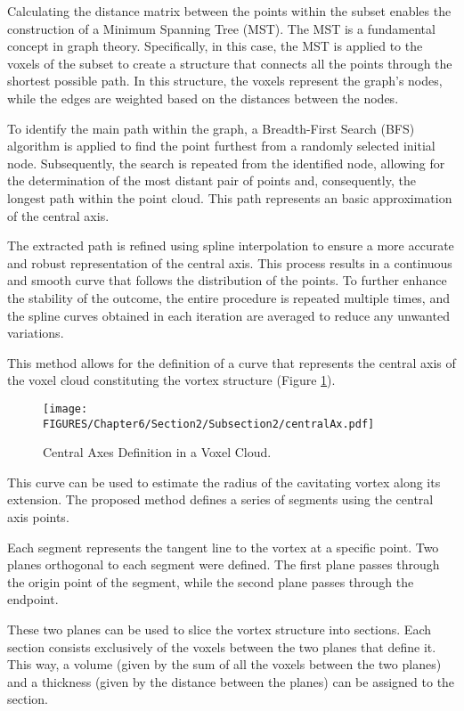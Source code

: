Calculating the distance matrix between the points within the subset enables the construction of a Minimum Spanning Tree (MST). 
The MST is a fundamental concept in graph theory. Specifically, in this case, the MST is applied to the voxels of the subset to create a structure that connects all the points through the shortest possible path. In this structure, the voxels represent the graph's nodes, while the edges are weighted based on the distances between the nodes.

To identify the main path within the graph, a Breadth-First Search (BFS) algorithm is applied to find the point furthest from a randomly selected initial node. Subsequently, the search is repeated from the identified node, allowing for the determination of the most distant pair of points and, consequently, the longest path within the point cloud. This path represents an basic approximation of the central axis.

The extracted path is refined using spline interpolation to ensure a more accurate and robust representation of the central axis. This process results in a continuous and smooth curve that follows the distribution of the points. 
To further enhance the stability of the outcome, the entire procedure is repeated multiple times, and the spline curves obtained in each iteration are averaged to reduce any unwanted variations.

This method allows for the definition of a curve that represents the central axis of the voxel cloud constituting the vortex structure (Figure \ref{fig:centralAx}).

\begin{figure}[h!]
    \centering
    \texttt{[image: FIGURES/Chapter6/Section2/Subsection2/centralAx.pdf]}
    \caption{Central Axes Definition in a Voxel Cloud.}
    \label{fig:centralAx}
\end{figure}

This curve can be used to estimate the radius of the cavitating vortex along its extension. The proposed method defines a series of segments using the central axis points. 

Each segment represents the tangent line to the vortex at a specific point. Two planes orthogonal to each segment were defined. The first plane passes through the origin point of the segment, while the second plane passes through the endpoint.

These two planes can be used to slice the vortex structure into sections. Each section consists exclusively of the voxels between the two planes that define it. 
This way, a volume (given by the sum of all the voxels between the two planes) and a thickness (given by the distance between the planes) can be assigned to the section. 

